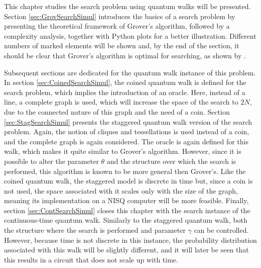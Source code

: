 \documentclass[../../dissertation.tex]{subfiles}
\begin{document}
This chapter studies the search problem using quantum walks will be presented.
Section \ref{sec:GrovSearchSimul} introduces the basics of a search problem by
presenting the theoretical framework of Grover's algorithm, followed by a
complexity analysis, together with Python plots for a better illustration.
Different numbers of marked elements will be shown and, by the end of the
section, it should be clear that Grover's algorithm is optimal for searching,
as shown by \cite{zalka1999}.\par

Subsequent sections are dedicated for the quantum walk instance of this
problem. In section \ref{sec:CoinedSearchSimul}, the coined quantum walk is
defined for the search problem, which implies the introduction of an oracle.
Here, instead of a line, a complete graph is used, which will increase the
space of the search to $2N$, due to the connected nature of this graph and the
need of a coin. Section \ref{sec:StagSearchSimul} presents the staggered
quantum walk version of the search problem. Again, the notion of cliques and
tessellations is used instead of a coin, and the complete graph is again
considered. The oracle is again defined for this walk, which makes it quite
similar to Grover's algorithm. However, since it is possible to alter the
parameter $\theta$ and the structure over which the search is performed, this
algorithm is known to be more general then Grover's. Like the coined quantum
walk, the staggered model is discrete in time but, since a coin is not used,
the space associated with it scales only with the size of the graph, meaning
its implementation on a NISQ computer will be more feasible. Finally, section
\ref{sec:ContSearchSimul} closes this chapter with the search instance of the
continuous-time quantum walk. Similarly to the staggered quantum walk, both the
structure where the search is performed and parameter $\gamma$ can be
controlled. However, because time is not discrete in this instance, the
probability distribution associated with this walk will be slightly different,
and it will later be seen that this results in a circuit that does not scale up
with time.  
\end{document}
